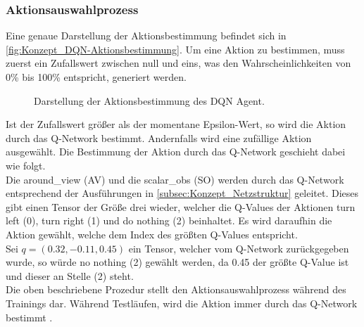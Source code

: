 \subsubsection{Aktionsauswahlprozess} \label{subsubsec:Konzept_Aktionsauswahlprozess_DQN}
Eine genaue Darstellung der Aktionsbestimmung befindet sich in \autoref{fig:Konzept_DQN-Aktionsbestimmung}. Um eine Aktion zu bestimmen, muss zuerst ein Zufallswert zwischen null und eins, was den Wahrscheinlichkeiten von 0\% bis 100\% entspricht, generiert werden.
\begin{figure}[H]
	\centering
	
	\caption[DQN Aktionsbestimmung]{Darstellung der Aktionsbestimmung des DQN Agent.}
	\label{fig:Konzept_DQN-Aktionsbestimmung}
\end{figure}
Ist der Zufallswert größer als der momentane Epsilon-Wert, so wird die Aktion durch das Q-Network bestimmt. Andernfalls wird eine zufällige Aktion ausgewählt. Die Bestimmung der Aktion durch das Q-Network geschieht dabei wie folgt.\\
Die around\_view (AV) und die scalar\_obs (SO) werden durch das Q-Network entsprechend der Ausführungen in \autoref{subsec:Konzept_Netzstruktur} geleitet. Dieses gibt einen Tensor der Größe drei wieder, welcher die Q-Values der Aktionen turn left (0), turn right (1) und do nothing (2) beinhaltet.
Es wird daraufhin die Aktion gewählt, welche dem Index des größten Q-Values entspricht.\\
Sei $q = (0.32, -0.11, 0.45)$ ein Tensor, welcher vom Q-Network zurückgegeben wurde, so würde no nothing (2) gewählt werden, da 0.45 der größte Q-Value ist und dieser an Stelle (2) steht.\\
Die oben beschriebene Prozedur stellt den Aktionsauswahlprozess während des Trainings dar. Während Testläufen, wird die Aktion immer durch das Q-Network bestimmt .

